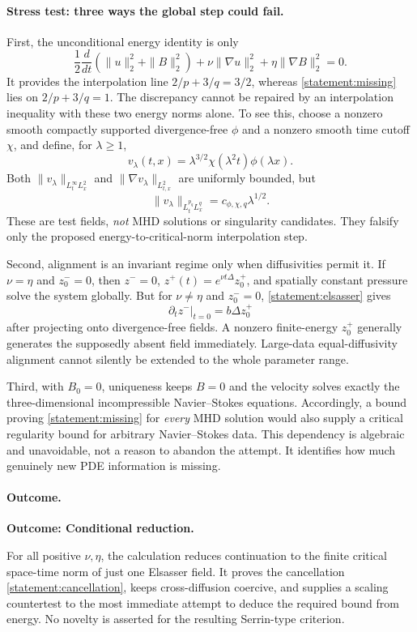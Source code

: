 \documentclass[11pt,a4paper]{article}
\numberwithin{equation}{section}
\begin{document}
\paragraph{Stress test: three ways the global step could fail.}
First, the unconditional energy identity is only
\[
 \frac12\frac d{dt}(\|u\|_2^2+\|B\|_2^2)
 +\nu\|\nabla u\|_2^2+\eta\|\nabla B\|_2^2=0.
\]
It provides the interpolation line $2/p+3/q=3/2$, whereas
\eqref{statement:missing} lies on $2/p+3/q=1$.
The discrepancy cannot be repaired by an interpolation inequality with
these two energy norms alone. To see this, choose a nonzero smooth compactly
supported divergence-free $\phi$ and a nonzero smooth time cutoff $\chi$,
and define, for $\lambda\geq1$,
\[
 v_\lambda(t,x)=\lambda^{3/2}\chi(\lambda^2t)\phi(\lambda x).
\]
Both $\|v_\lambda\|_{L^\infty_tL^2_x}$ and
$\|\nabla v_\lambda\|_{L^2_{t,x}}$ are uniformly bounded, but
\[
 \|v_\lambda\|_{L^{p_q}_tL^q_x}
 =c_{\phi,\chi,q}\lambda^{1/2}.
\]
These are test fields, \emph{not} MHD solutions or singularity candidates.
They falsify only the proposed energy-to-critical-norm interpolation step.

Second, alignment is an invariant regime only when diffusivities permit it.
If $\nu=\eta$ and $z^-_0=0$, then
$z^-=0$, $z^+(t)=e^{\nu t\Delta}z^+_0$, and spatially constant pressure
solve the system globally. But for $\nu\ne\eta$ and $z^-_0=0$,
\eqref{statement:elsasser} gives
\[
 \partial_tz^-\big|_{t=0}=b\Delta z^+_0
\]
after projecting onto divergence-free fields. A nonzero finite-energy
$z^+_0$ generally generates the supposedly absent field immediately.
Large-data equal-diffusivity alignment cannot silently be extended to the
whole parameter range.

Third, with $B_0=0$, uniqueness keeps $B=0$ and the velocity solves exactly
the three-dimensional incompressible Navier--Stokes equations. Accordingly,
a bound proving \eqref{statement:missing} for \emph{every} MHD solution would also
supply a critical regularity bound for arbitrary Navier--Stokes data.
This dependency is algebraic and unavoidable, not a reason to abandon the
attempt. It identifies how much genuinely new PDE information is missing.

\paragraph{Outcome.}
\textbf{Outcome: Conditional reduction.}

For all positive $\nu,\eta$, the calculation reduces continuation to the
finite critical space-time norm of just one Elsasser field. It proves the
cancellation \eqref{statement:cancellation}, keeps cross-diffusion coercive,
and supplies a scaling countertest to the most immediate attempt to deduce
the required bound from energy. No novelty is asserted for the resulting
Serrin-type criterion.
\end{document}
